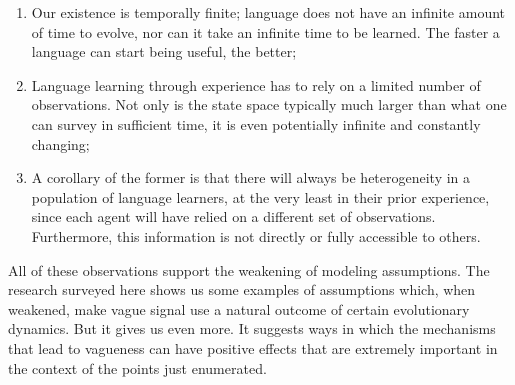 \documentclass[a4paper]{article}
\begin{document}
\begin{enumerate}
\item Our existence is temporally finite; language does not have an infinite amount of time to evolve, nor can it take an infinite time to be learned. The faster a language can start being useful, the better;
\item Language learning through experience has to rely on a limited number of observations. Not only is the state space typically much larger than what one can survey in sufficient time, it is even potentially infinite and constantly changing;
\item A corollary of the former is that there will always be heterogeneity in a population of language learners, at the very least in their prior experience, since each agent will have relied on a different set of observations. Furthermore, this information is not directly or fully accessible to others.
\end{enumerate}
All of these observations support the weakening of modeling assumptions.
The research surveyed here shows us some examples of assumptions which, when weakened, make vague signal use a natural outcome of certain evolutionary dynamics.
But it gives us even more.
It suggests ways in which the mechanisms that lead to vagueness can have positive effects that are extremely important in the context of the points just enumerated.
\end{document}
